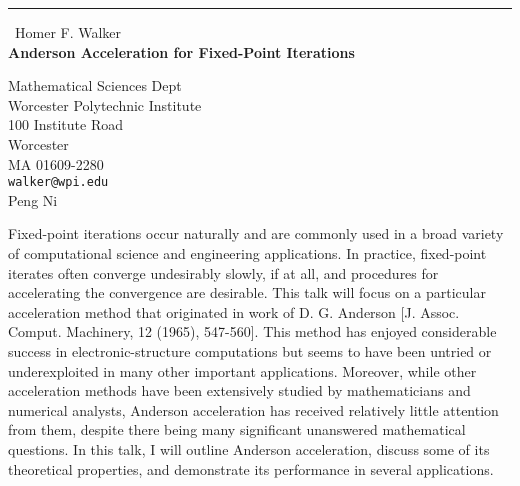 \documentclass{report}
\begin{document}
\begin{center}
\rule{6in}{1pt} \
{\large Homer F. Walker \\
{\bf Anderson Acceleration for Fixed-Point Iterations}}

Mathematical Sciences Dept \\ Worcester Polytechnic Institute \\ 100 Institute Road \\ Worcester \\ MA 01609-2280
\\
{\tt walker@wpi.edu}\\
Peng Ni\end{center}

Fixed-point iterations occur naturally and are commonly used in a broad
variety of computational science and engineering applications. In
practice, fixed-point iterates often converge undesirably slowly, if at
all, and procedures for accelerating the convergence are desirable. This
talk will focus on a particular acceleration method that originated in
work of D. G. Anderson [J. Assoc. Comput. Machinery, 12 (1965), 547-560].
This method has enjoyed considerable success in electronic-structure
computations but seems to have been untried or underexploited in many
other important applications. Moreover, while other acceleration methods
have been extensively studied by mathematicians and numerical analysts,
Anderson acceleration has received relatively little attention from them,
despite there being many significant unanswered mathematical questions.
In this talk, I will outline Anderson acceleration, discuss some of its
theoretical properties, and demonstrate its performance in several
applications.
\end{document}
